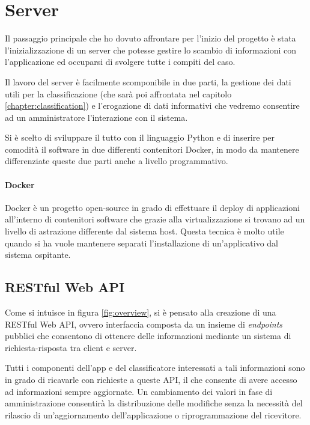 \chapter{Server}
Il passaggio principale che ho dovuto affrontare per l'inizio del progetto è stata l'inizializzazione
di un server che potesse gestire lo scambio di informazioni con l'applicazione ed occuparsi di svolgere tutte i compiti del caso.

Il lavoro del server è facilmente scomponibile in due parti, la gestione dei dati utili per la classificazione 
(che sarà poi affrontata nel capitolo \ref{chapter:classification}) e l'erogazione di dati informativi che vedremo consentire
ad un amministratore l'interazione con il sistema.

Si è scelto di sviluppare il tutto con il linguaggio Python e di inserire per comodità il software in due differenti contenitori Docker, in modo da 
mantenere differenziate queste due parti anche a livello programmativo.

\subsubsection{Docker}
Docker \cite{docker} è un progetto open-source in grado di effettuare il deploy di applicazioni all'interno di contenitori software che grazie alla
virtualizzazione si trovano ad un livello di astrazione differente dal sistema host. Questa tecnica è molto utile quando si ha vuole
mantenere separati l'installazione di un'applicativo dal sistema ospitante.



\section{RESTful Web API}
\label{section:api}
Come si intuisce in figura \ref{fig:overview}, si è pensato alla creazione di una RESTful Web API, ovvero interfaccia composta da un insieme
di \textit{endpoints} pubblici che consentono di ottenere delle informazioni mediante un sistema di richiesta-risposta tra client e server.

Tutti i componenti dell'app e del classificatore interessati a tali informazioni sono in grado di ricavarle con richieste a queste API, il che 
consente di avere accesso ad informazioni sempre aggiornate. Un cambiamento dei valori in fase di amministrazione consentirà la 
distribuzione delle modifiche senza la necessità del rilascio di un'aggiornamento dell'applicazione o riprogrammazione del ricevitore.


